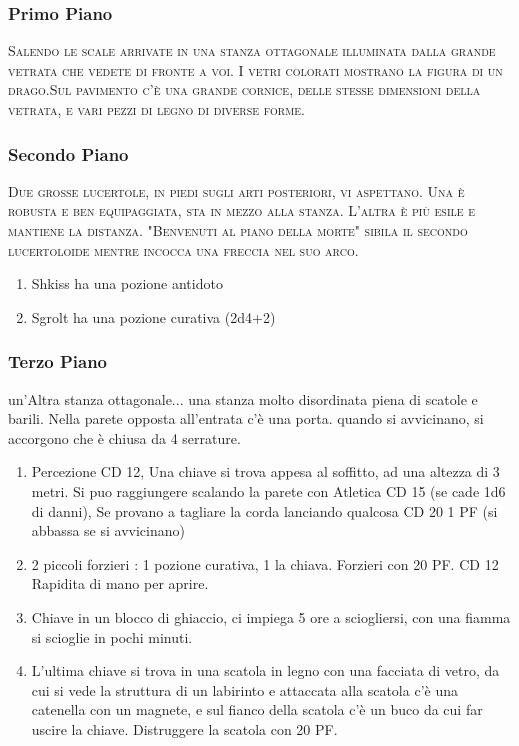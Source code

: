 \documentclass{article}
\begin{document}
            \subsubsection{Primo Piano}
    \textsc{Salendo le scale arrivate in una stanza ottagonale illuminata dalla grande vetrata che vedete di fronte a voi. I vetri colorati mostrano la figura di un drago.Sul pavimento c'è una grande cornice, delle stesse dimensioni della vetrata, e vari pezzi di legno di diverse forme.}
            \subsubsection{Secondo Piano}
\textsc{Due grosse lucertole, in piedi sugli arti posteriori, vi aspettano.
Una è robusta e ben equipaggiata, sta in mezzo alla stanza.
L'altra è più esile e mantiene la distanza. "Benvenuti al piano
della morte" sibila il secondo lucertoloide mentre incocca una
freccia nel suo arco.}

\begin{enumerate}
    \item Shkiss ha una pozione antidoto
    \item Sgrolt ha una pozione curativa (2d4+2) 
\end{enumerate}

            \subsubsection{Terzo Piano}
un'Altra stanza ottagonale... una stanza molto disordinata piena di scatole e barili. Nella parete opposta all'entrata c'è una porta. quando si avvicinano, si accorgono che è chiusa da 4 serrature. 
\begin{enumerate}
    \item Percezione CD 12, Una chiave si trova appesa al soffitto, ad una altezza di 3 metri. Si puo raggiungere scalando la parete con Atletica CD 15 (se cade 1d6 di danni), Se provano a tagliare la corda lanciando qualcosa CD 20 1 PF
    (si abbassa se si avvicinano)
    \item 2 piccoli forzieri : 1 pozione curativa, 1 la chiava. Forzieri con 20 PF. CD 12 Rapidita di mano per aprire.
    \item Chiave in un blocco di ghiaccio, ci impiega 5 ore a sciogliersi, con una fiamma si scioglie in pochi minuti. 
    \item L'ultima chiave si trova in una scatola in legno con una facciata di vetro, da cui si vede la struttura di un labirinto e attaccata alla scatola c'è una catenella con un magnete, e sul fianco della scatola c'è un buco da cui far uscire la chiave. Distruggere la scatola con 20 PF.
    \end{enumerate}
\end{document}
